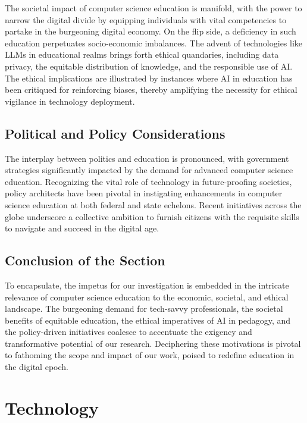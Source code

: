 \documentclass[]{article}
\begin{document}
The societal impact of computer science education is manifold, with the power to narrow the digital divide by equipping individuals with vital competencies to partake in the burgeoning digital economy. On the flip side, a deficiency in such education perpetuates socio-economic imbalances. The advent of technologies like LLMs in educational realms brings forth ethical quandaries, including data privacy, the equitable distribution of knowledge, and the responsible use of AI. The ethical implications are illustrated by instances where AI in education has been critiqued for reinforcing biases, thereby amplifying the necessity for ethical vigilance in technology deployment.

\subsection{Political and Policy Considerations}

The interplay between politics and education is pronounced, with government strategies significantly impacted by the demand for advanced computer science education. Recognizing the vital role of technology in future-proofing societies, policy architects have been pivotal in instigating enhancements in computer science education at both federal and state echelons. Recent initiatives across the globe underscore a collective ambition to furnish citizens with the requisite skills to navigate and succeed in the digital age.

\subsection{Conclusion of the Section}

To encapsulate, the impetus for our investigation is embedded in the intricate relevance of computer science education to the economic, societal, and ethical landscape. The burgeoning demand for tech-savvy professionals, the societal benefits of equitable education, the ethical imperatives of AI in pedagogy, and the policy-driven initiatives coalesce to accentuate the exigency and transformative potential of our research. Deciphering these motivations is pivotal to fathoming the scope and impact of our work, poised to redefine education in the digital epoch.

\section{Technology}
\end{document}
